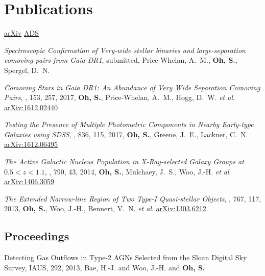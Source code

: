 \documentclass[11pt,letterpaper]{article}
\newcommand*\arxiv[1]{\href{https://arxiv.org/abs/#1}{arXiv:#1}}
\newcommand{\etal}{\textit{et al}.}
\begin{document}
\section*{Publications}
\href{https://arxiv.org/find/all/1/all:+AND+semyeong+oh/0/1/0/all/0/1}{arXiv}
\href{http://adsabs.harvard.edu/cgi-bin/nph-abs_connect?library&libname=Semyeong+Oh&libid=4e8800e01f}{ADS}

\begin{etaremune}

  \item {\it Spectroscopic Confirmation of Very-wide stellar binaries and
      large-separation comoving pairs from Gaia DR1},
    submitted, {{Price-Whelan}, A.~M., {\bf {Oh}, S.}, {Spergel}, D.~N.}

  \item {\it Comoving Stars in Gaia DR1: An Abundance of Very Wide Separation Comoving Pairs},
    \aj, 153, 257, 2017, {{\bf {Oh}, S.}, {Price-Whelan}, A.~M., {Hogg}, D.~W. \etal}
    \arxiv{1612.02440}

  \item {\it Testing the Presence of Multiple Photometric Components in Nearby Early-type Galaxies using SDSS},
    \apj, 836, 115, 2017,
    {{\bf {Oh}, S.}, {Greene}, J.~E., {Lackner}, C.~N.}
		\arxiv{1612.06495}

  \item {\it The Active Galactic Nucleus Population in X-Ray-selected Galaxy Groups at $0.5 < z < 1.1$},
    \apj, 790, 43, 2014,
    {{\bf {Oh}, S.}, {Mulchaey}, J.~S., {Woo}, J.-H. \etal}
		\arxiv{1406.3059}

	\item {\it The Extended Narrow-line Region of Two Type-I Quasi-stellar Objects},
    \apj, 767, 117, 2013,
    {{\bf {Oh}, S.}, {Woo}, J.-H., {Bennert}, V.~N. \etal} \arxiv{1303.6212}
\end{etaremune}

\subsection*{Proceedings}

\begin{etaremune}
  \item {Detecting Gas Outflows in Type-2 AGNs Selected from the Sloan Digital Sky Survey},
  IAUS, 292, 2013,
  {{Bae}, H.-J. and {Woo}, J.-H. and {\bf {Oh}, S.}}
\end{etaremune}
\end{document}
